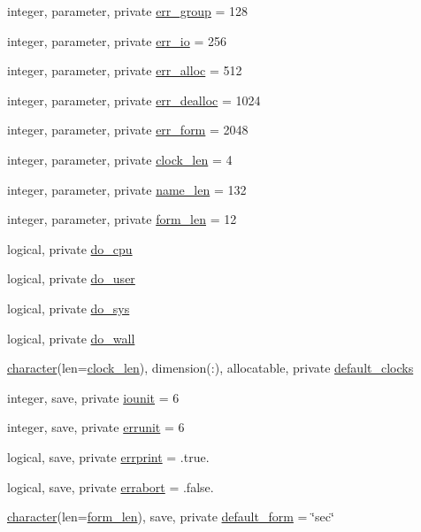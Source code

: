 \begin{DoxyCompactItemize}
\item 
integer, parameter, private \hyperlink{namespacem__stopwatch_a1c604413553a07ab9a6aad2b069c5550}{err\+\_\+group} = 128
\item 
integer, parameter, private \hyperlink{namespacem__stopwatch_a1a28d40aeec8f031d0be2736dea2dcb0}{err\+\_\+io} = 256
\item 
integer, parameter, private \hyperlink{namespacem__stopwatch_a00c8cbc3b0095ebfbcfd00e7f815171e}{err\+\_\+alloc} = 512
\item 
integer, parameter, private \hyperlink{namespacem__stopwatch_a7e2fd6739245fccd789135d8a1a5b9db}{err\+\_\+dealloc} = 1024
\item 
integer, parameter, private \hyperlink{namespacem__stopwatch_a3f65b21696fb62f2c040db063d475418}{err\+\_\+form} = 2048
\item 
integer, parameter, private \hyperlink{namespacem__stopwatch_aa5f2b7700fd32f070e22af9950c47805}{clock\+\_\+len} = 4
\item 
integer, parameter, private \hyperlink{namespacem__stopwatch_a90c3eba08ec94bd1499d3afcd621d045}{name\+\_\+len} = 132
\item 
integer, parameter, private \hyperlink{namespacem__stopwatch_ae96391d876b6e7b05510e339a2e68d20}{form\+\_\+len} = 12
\item 
logical, private \hyperlink{namespacem__stopwatch_a6856aa4d5ac6088d533a30e1087bb9c8}{do\+\_\+cpu}
\item 
logical, private \hyperlink{namespacem__stopwatch_a29b343b01ae1c7098ed8f78872f8f9e2}{do\+\_\+user}
\item 
logical, private \hyperlink{namespacem__stopwatch_a252497fad53bb1f78a57df3a36ecc963}{do\+\_\+sys}
\item 
logical, private \hyperlink{namespacem__stopwatch_a47f4d2cbcd792fa3ad9eab7b216b06c3}{do\+\_\+wall}
\item 
\hyperlink{option__stopwatch_83_8txt_abd4b21fbbd175834027b5224bfe97e66}{character}(len=\hyperlink{namespacem__stopwatch_aa5f2b7700fd32f070e22af9950c47805}{clock\+\_\+len}), dimension(\+:), allocatable, private \hyperlink{namespacem__stopwatch_a779dc9ad87f18ac158e8ac6cb47601e4}{default\+\_\+clocks}
\item 
integer, save, private \hyperlink{namespacem__stopwatch_a3f5d3edd3b740437b0e59f64bc956402}{iounit} = 6
\item 
integer, save, private \hyperlink{namespacem__stopwatch_a1a56c421f8dda3ea8ff78ee49d1d4e11}{errunit} = 6
\item 
logical, save, private \hyperlink{namespacem__stopwatch_a8092ca2d20b2b127a24fb4cb906b96be}{errprint} = .true.
\item 
logical, save, private \hyperlink{namespacem__stopwatch_ab704edc792bb62b6966e6d390be99a65}{errabort} = .false.
\item 
\hyperlink{option__stopwatch_83_8txt_abd4b21fbbd175834027b5224bfe97e66}{character}(len=\hyperlink{namespacem__stopwatch_ae96391d876b6e7b05510e339a2e68d20}{form\+\_\+len}), save, private \hyperlink{namespacem__stopwatch_a8bd2994267296dcfb8d6ca82c30e0db3}{default\+\_\+form} = \char`\"{}sec\char`\"{}
\end{DoxyCompactItemize}


